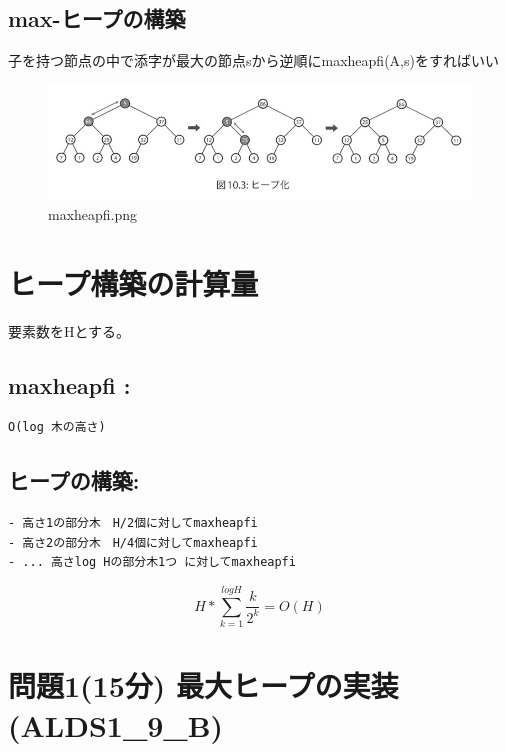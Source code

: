 \documentclass[11pt]{article}
\makeatletter
\def\maxwidth{\ifdim\Gin@nat@width>\linewidth\linewidth
    \else\Gin@nat@width\fi}
\let\Oldincludegraphics\includegraphics
\renewcommand{\includegraphics}[1]{\Oldincludegraphics[width=.8\maxwidth]{#1}}
\makeatother
\begin{document}
\subsection{max-ヒープの構築}\label{max-ux30d2ux30fcux30d7ux306eux69cbux7bc9}

子を持つ節点の中で添字が最大の節点sから逆順にmaxheapfi(A,s)をすればいい

\begin{figure}
\centering
\includegraphics{imgs/maxheapfi.png}
\caption{maxheapfi.png}
\end{figure}

    \section{ヒープ構築の計算量}\label{ux30d2ux30fcux30d7ux69cbux7bc9ux306eux8a08ux7b97ux91cf}

要素数をHとする。

\subsection{maxheapfi :}\label{maxheapfi}

\begin{verbatim}
O(log 木の高さ)
\end{verbatim}

\subsection{ヒープの構築:}\label{ux30d2ux30fcux30d7ux306eux69cbux7bc9}

\begin{verbatim}
- 高さ1の部分木　H/2個に対してmaxheapfi
- 高さ2の部分木　H/4個に対してmaxheapfi
- ... 高さlog Hの部分木1つ に対してmaxheapfi
\end{verbatim}

\[ H * \sum^{logH}_{k=1} \frac{k}{2^k} = O(H) \]

    \section{問題1(15分)
最大ヒープの実装(ALDS1\_9\_B)}\label{ux554fux984c115ux5206-ux6700ux5927ux30d2ux30fcux30d7ux306eux5b9fux88c5alds1_9_b}
\end{document}
